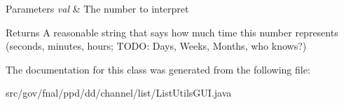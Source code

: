 \begin{DoxyParams}{Parameters}
{\em val} & The number to interpret \\
\hline
\end{DoxyParams}
\begin{DoxyReturn}{Returns}
A reasonable string that says how much time this number represents (seconds, minutes, hours; T\-O\-D\-O\-: Days, Weeks, Months, who knows?) 
\end{DoxyReturn}


The documentation for this class was generated from the following file\-:\begin{DoxyCompactItemize}
\item 
src/gov/fnal/ppd/dd/channel/list/List\-Utils\-G\-U\-I.\-java\end{DoxyCompactItemize}
